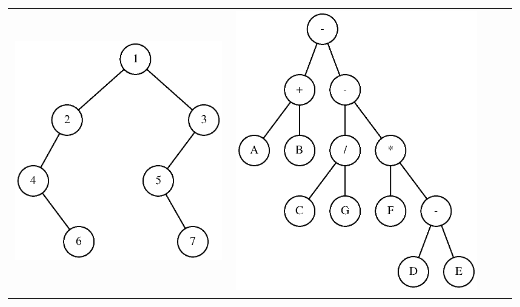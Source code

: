 \documentclass[aspectratio=169]{beamer}
\begin{document}
\begin{frame}[fragile]
\begin{enumerate}
\begin{tabular}{llll}
\includegraphics[height=0.5\paperheight]{imagens/arvore_binaria06.eps} &
\includegraphics[height=0.5\paperheight]{imagens/arvore_binaria07.eps} \\
\end{tabular}
\end{enumerate}
\end{frame}
\end{document}
